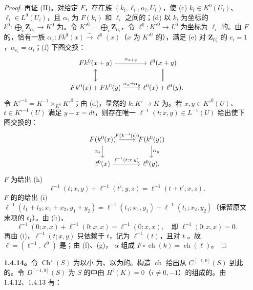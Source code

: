 \begin{proof}
再证 (II)。对给定 $F$，存在族 $(k_i,\ell_i,\alpha_i,U_i)$，使 (c) $k_i\in K^0(U_i)$、$\ell_i\in L^0(U_i)$，且 $\alpha_i$ 为 $F(k_i)$ 和 $\ell_i$ 之间的；(d) 以 $k_i$ 为坐标的 $k^0:\bigoplus_i\mathbf Z_{U_i}\to K^0$ 为。令 $K'^0=\bigoplus_i\mathbf Z_{U_i}$，令 $\ell^0:K'^0\to L^0$ 为坐标为 $\ell_i$ 的。由 $F$ 的，恰有一族 $\alpha_x:Fk^0(x)\xrightarrow\sim\ell^0(x)$（$x$ 为 $K'^0$ 的），满足 (e) 对 $\mathbf Z_{U_i}$ 的 $e_i=1$，$\alpha_{e_i}=\alpha_i$；(f) 下图交换：
\[\begin{tikzcd}Fk^0(x+y)\arrow[r,"\alpha_{x+y}"]\arrow[d,leftrightarrow]&\ell^0(x+y)\arrow[d,equal]\\Fk^0(x)+Fk^0(y)\arrow[r,"\alpha_x+\alpha_y"]&\ell^0(x)+\ell^0(y).\end{tikzcd}\]
令 $K'^{-1}=K^{-1}\times_{K^0}K'^0$；由 (d)，显然的 $k:K'\to K$ 为。若 $x,y\in K'^0(U)$、$t\in K'^{-1}(U)$ 满足 $y-x=dt$，则存在唯一 $\ell^{-1}(t;x,y)\in L^{-1}(U)$ 给出使下图交换的：
\[\begin{tikzcd}F(k^0(x))\arrow[r,"F(k^{-1}(t))"]\arrow[d,"\alpha_x"']&F(k^0(y))\arrow[d,"\alpha_y"]\\\ell^0(x)\arrow[r,"{\ell^{-1}(t;x,y)}"]&\ell^0(y).\end{tikzcd}\]
$F$ 为给出 (h)
\[\ell^{-1}(t;x,y)+\ell^{-1}(t';y,z)=\ell^{-1}(t+t';x,z).\]
$F$ 的的给出
(i) $\ell^{-1}(t_1+t_2;x_1+x_2,y_1+y_2)=\ell^{-1}(t_1;x_1,y_1)+\ell^{-1}(t_1;x_2,y_2)$（保留原文末项的 $t_1$）。由 (h)，
\[\ell^{-1}(0;x,x)+\ell^{-1}(0;x,x)=\ell^{-1}(0;x,x),\quad\text{即 }\ell^{-1}(0;x,x)=0.\]
再由 (i)，$\ell^{-1}(t;x,y)$ 只依赖于 $t$，记为 $\ell^{-1}(t)$，且对 $t$ 。故 $\ell=(\ell^{-1},\ell^0)$ 是；由 (f)、(g)， $\alpha$ 组成 $F\circ\operatorname{ch}(k)=\operatorname{ch}(\ell)$。
\end{proof}
\textbf{1.4.14。}令 $\operatorname{Ch}^{\flat}(S)$ 为以小 为、以为的。构造 $\operatorname{ch}$ 给出从 $C^{[-1,0]}(S)$ 到此的。令 $D^{[-1,0]}(S)$ 为 $S$ 的中由 $H^i(K)=0$（$i\ne0,-1$）的组成的。由 1.4.12、1.4.13 有：
